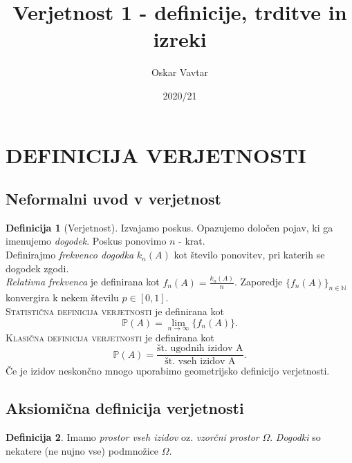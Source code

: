 \documentclass[11pt]{article}
\title{Verjetnost 1 - definicije, trditve in izreki}
\author{Oskar Vavtar}
\date{2020/21}
\theoremstyle{definition}
\newtheorem{definicija}{Definicija}[section]
\theoremstyle{definition}
\theoremstyle{definition}
\begin{document}
\maketitle
\pagebreak
\tableofcontents
\pagebreak


\section{DEFINICIJA VERJETNOSTI}


\subsection{Neformalni uvod v verjetnost}

\begin{definicija}[Verjetnost]

Izvajamo poskus. Opazujemo določen pojav, ki ga imenujemo \textit{dogodek}. Poskus ponovimo $n$ - krat. \\
Definirajmo \textit{frekvenco dogodka} $k_n(A)$ kot število ponovitev, pri katerih se dogodek zgodi. \\
\textit{Relativna frekvenca} je definirana kot $f_n(A) = \frac{k_n(A)}{n}$.
Zaporedje $\{f_n(A)\}_{n \in \mathbb{N}}$ konvergira k nekem številu $p \in [0, 1].$ \\
\textsc{Statistična definicija verjetnosti} je definirana kot
$$\mathbb{P}(A) = \lim_{n\to\infty} \{f_n(A)\}.$$
\textsc{Klasična definicija verjetnosti} je definirana kot
$$\mathbb{P}(A) = \frac{\text{št. ugodnih izidov A}}{\text{št. vseh izidov A}}.$$
Če je izidov neskončno mnogo uporabimo geometrijsko definicijo verjetnosti.

\end{definicija}
\vspace{0.5cm}


\subsection{Aksiomična definicija verjetnosti}
\vspace{0.5cm}

\begin{definicija}

Imamo \textit{prostor vseh izidov} oz. \textit{vzorčni prostor} $\Omega$. \textit{Dogodki} so nekatere (ne nujno vse) podmnožice $\Omega$.

\end{definicija}
\vspace{0.5cm}
\end{document}
